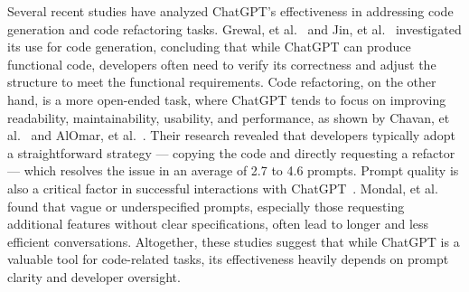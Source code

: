 Several recent studies have analyzed ChatGPT's effectiveness in addressing code generation and code refactoring tasks. Grewal, et al.~\cite{Grewal2024-codegen} and Jin, et al.~\cite{Jin2024-codegen} investigated its use for code generation, concluding that while ChatGPT can produce functional code, developers often need to verify its correctness and adjust the structure to meet the functional requirements. Code refactoring, on the other hand, is a more open-ended task, where ChatGPT tends to focus on improving readability, maintainability, usability, and performance, as shown by Chavan, et al.~\cite{Chavan2024-refactoring} and AlOmar, et al.~\cite{AlOmar2024-refactoring}. Their research revealed that developers typically adopt a straightforward strategy --- copying the code and directly requesting a refactor --- which resolves the issue in an average of 2.7 to 4.6 prompts. Prompt quality is also a critical factor in successful interactions with ChatGPT~\cite{Mondal2024-prompts-issues, Wu2024-promptpatterns}. Mondal, et al.~\cite{Mondal2024-prompts-issues} found that vague or underspecified prompts, especially those requesting additional features without clear specifications, often lead to longer and less efficient conversations. Altogether, these studies suggest that while ChatGPT is a valuable tool for code-related tasks, its effectiveness heavily depends on prompt clarity and developer oversight.